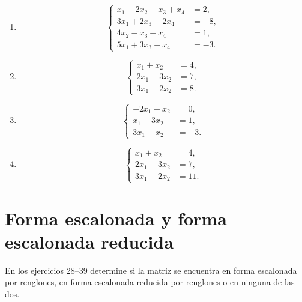 \documentclass[12pt]{article}
\newcommand{\sistema}[1]{%
\[
\left\{
\begin{aligned}
#1
\end{aligned}
\right.
\]
}
\begin{document}
\begin{enumerate}[label=\textbf{\arabic*.},leftmargin=*]
\item \sistema{
x_1-2x_2+x_3+x_4&=2,\\
3x_1+2x_3-2x_4&=-8,\\
4x_2-x_3-x_4&=1,\\
5x_1+3x_3-x_4&=-3.
}

\item \sistema{
x_1+x_2&=4,\\
2x_1-3x_2&=7,\\
3x_1+2x_2&=8.
}

\item \sistema{
-2x_1+x_2&=0,\\
x_1+3x_2&=1,\\
3x_1-x_2&=-3.
}

\item \sistema{
x_1+x_2&=4,\\
2x_1-3x_2&=7,\\
3x_1-2x_2&=11.
}

\end{enumerate}

\section{Forma escalonada y forma escalonada reducida}

En los ejercicios 28--39 determine si la matriz se encuentra en forma escalonada por
renglones, en forma escalonada reducida por renglones o en ninguna de las dos.
\end{document}
